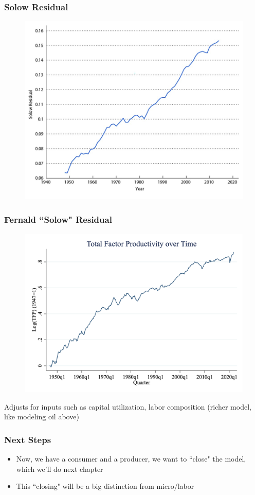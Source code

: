 \documentclass{beamer}
\begin{document}
\begin{frame}
\frametitle[alignment=center]{Solow Residual}
\begin{figure}
\centering
\includegraphics[scale=0.5]{Figures/W_Fig_4pt18.png}
\end{figure}
\end{frame}


\begin{frame}
\frametitle[alignment=center]{Fernald ``Solow" Residual}
\begin{figure}
\centering
\includegraphics[scale=0.2]{Figures/Fernald_TFP.png}
\end{figure}
Adjusts for inputs such as capital utilization, labor composition (richer model, like modeling oil above)
\end{frame}



\begin{frame}
\frametitle[alignment=center]{Next Steps}
\begin{itemize}
\item Now, we have a consumer and a producer, we want to ``close" the model, which we'll do next chapter
\bigskip
\item This ``closing" will be a big distinction from micro/labor
\end{itemize}
\end{frame}
\end{document}
